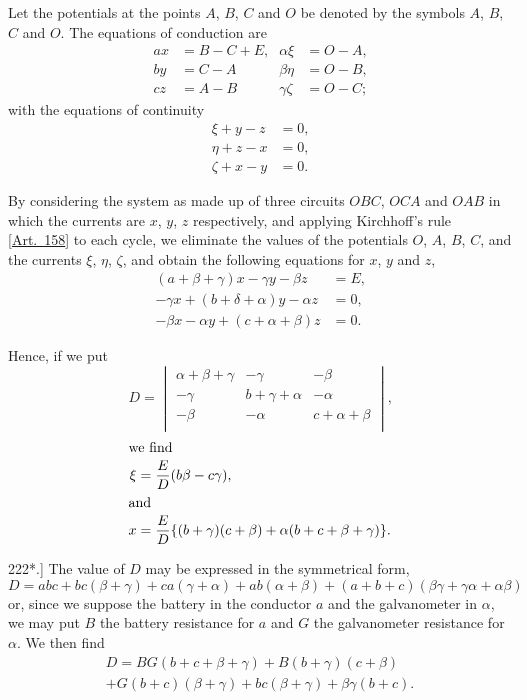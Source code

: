\documentclass[12pt,oneside]{book}[2021/10/04]
\newcommand{\article}[1]{\phantomsection \label{art:#1}{#1.]}}
\newcommand{\¬}{\hphantom{0}}
\begin{document}
Let the potentials at the points \(A\), \(B\), \(C\) and \(O\) be denoted by
the symbols \(A\), \(B\), \(C\) and \(O\). The equations of conduction are
\begin{align*}
ax &= B-C+ E\text{,} & \alpha \xi &= O-A\text{,}\\
by &= C-A & \beta \eta &= O-B\text{,}\\
cz &= A-B & \gamma \zeta &= O-C\text{;}
\end{align*}
with the equations of continuity
\begin{align*}
\xi + y - z &= 0\text{,}\\
\eta + z - x &= 0\text{,}\\
\zeta + x - y &= 0\text{.}
\end{align*}

By considering the system as made up of three circuits \(OBC\),
\(OCA\) and \(OAB\) in which the currents are \(x\), \(y\), \(z\) respectively, and
applying Kirchhoff's rule [\hyperref[art:158*]{Art.\ 158}] to each cycle, we eliminate the
values of the potentials \(O\), \(A\), \(B\), \(C\), and the currents \(\xi\), \(\eta\), \(\zeta\), and
obtain the following equations for \(x\), \(y\) and \(z\),
\begin{align*}
(a + \beta + \gamma )x - \gamma y - \beta z &= E\text{,}\\
- \gamma x + (b + \delta + \alpha )y - \alpha z &= 0\text{,}\\
- \beta x - \alpha y + (c + \alpha + \beta )z &= 0\text{.}
\end{align*}

Hence, if we put
\[
D =
\begin{vmatrix}
\alpha + \beta + \gamma & -\gamma & - \beta  \\
-\gamma & b + \gamma + \alpha & - \alpha \\
- \beta & - \alpha & c + \alpha + \beta \\
\end{vmatrix}
\text{,}
\]
\begin{align*}
\shortintertext{we find}
\xi &= \frac{E}{D}(b\beta - c\gamma)\text{,}\\
\shortintertext{and}
x &= \frac{E}{D} \{(b + \gamma)(c + \beta) + \alpha (b + c + \beta + \gamma )\}\text{.}
\end{align*}

\article{222*} The value of \(D\) may be expressed in the symmetrical form,
\[
D = abc + bc(\beta+\gamma)+ca(\gamma+\alpha)+ab(\alpha+\beta)+(a+b+c)(\beta\gamma+\gamma\alpha+\alpha\beta)
\]
or, since we suppose the battery in the conductor \(a\) and the
galvanometer in \(\alpha\), we may put \(B\) the battery resistance for \(a\) and
\(G\) the galvanometer resistance for \(\alpha\). We then find
\begin{multline*}
D = BG(b+c+\beta+\gamma)+B(b+\gamma)(c+\beta)\\
+ G(b+c)(\beta+\gamma)+bc(\beta+\gamma)+\beta\gamma(b+c)\text{.}
\end{multline*}
\end{document}

